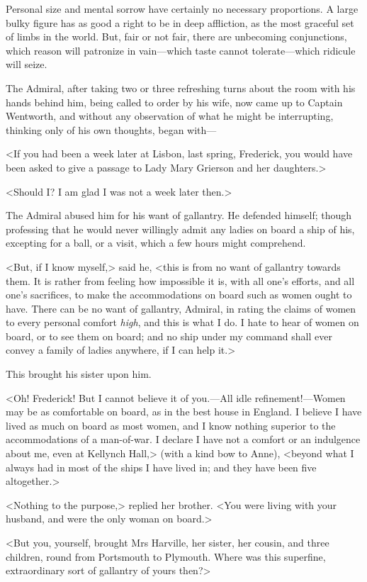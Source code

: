 Personal size and mental sorrow have certainly no necessary proportions. A large bulky figure has as good a right to be in deep affliction, as the most graceful set of limbs in the world. But, fair or not fair, there are unbecoming conjunctions, which reason will patronize in vain—which taste cannot tolerate—which ridicule will seize.

The Admiral, after taking two or three refreshing turns about the room with his hands behind him, being called to order by his wife, now came up to Captain Wentworth, and without any observation of what he might be interrupting, thinking only of his own thoughts, began with—

<If you had been a week later at Lisbon, last spring, Frederick, you would have been asked to give a passage to Lady Mary Grierson and her daughters.>

<Should I\@? I am glad I was not a week later then.>

The Admiral abused him for his want of gallantry. He defended himself; though professing that he would never willingly admit any ladies on board a ship of his, excepting for a ball, or a visit, which a few hours might comprehend.

<But, if I know myself,> said he, <this is from no want of gallantry towards them. It is rather from feeling how impossible it is, with all one's efforts, and all one's sacrifices, to make the accommodations on board such as women ought to have. There can be no want of gallantry, Admiral, in rating the claims of women to every personal comfort \textit{high}, and this is what I do. I hate to hear of women on board, or to see them on board; and no ship under my command shall ever convey a family of ladies anywhere, if I can help it.>

This brought his sister upon him.

<Oh! Frederick! But I cannot believe it of you.—All idle refinement!—Women may be as comfortable on board, as in the best house in England. I believe I have lived as much on board as most women, and I know nothing superior to the accommodations of a man-of-war. I declare I have not a comfort or an indulgence about me, even at Kellynch Hall,> (with a kind bow to Anne), <beyond what I always had in most of the ships I have lived in; and they have been five altogether.>

<Nothing to the purpose,> replied her brother. <You were living with your husband, and were the only woman on board.>

<But you, yourself, brought Mrs Harville, her sister, her cousin, and three children, round from Portsmouth to Plymouth. Where was this superfine, extraordinary sort of gallantry of yours then?>

